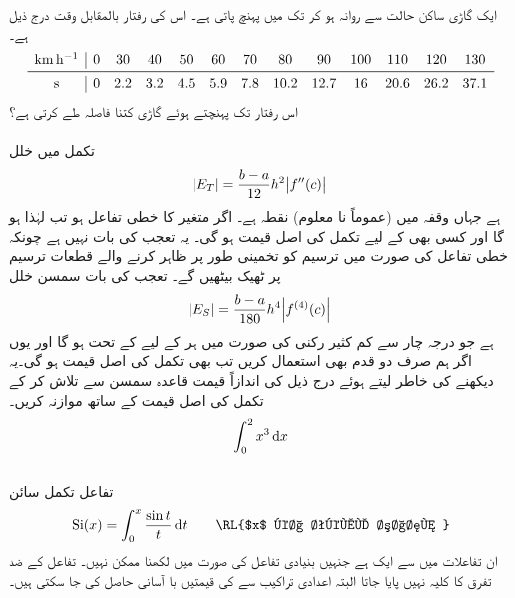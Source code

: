 ایک گاڑی ساکن حالت سے روانہ ہو کر  تک  میں پہنچ پاتی ہے۔ اس کی رفتار بالمقابل وقت درج ذیل ہے۔
\begin{align*}
\begin{array}{c|cccc cccc cccc}
\si{\kilo\meter\per\hour}&0&30&40&50&60&70&80&90&100&110&120&130\\
\midrule
\si{\second}&0&2.2&3.2&4.5&5.9&7.8&10.2&12.7&16&20.6&26.2&37.1
\end{array}
\end{align*}
اس رفتار تک پہنچتے ہوئے گاڑی کتنا فاصلہ طے کرتی ہے؟
\\
\\
تکمل  میں خلل
\begin{align*}
\abs{E_T}=\frac{b-a}{12}h^2\abs{f''(c)}
\end{align*}
ہے جہاں  وقفہ  میں  (عموماً نا معلوم) نقطہ ہے۔ اگر  متغیر  کا خطی تفاعل ہو تب   لہٰذا  ہو گا اور کسی بھی  کے لیے تکمل کی اصل قیمت  ہو گی۔ یہ تعجب کی بات نہیں ہے چونکہ خطی تفاعل کی صورت میں ترسیم کو تخمینی طور پر ظاہر کرنے والے قطعات ترسیم پر ٹھیک بیٹھیں گے۔  تعجب کی بات سمسن خلل
\begin{align*}
\abs{E_S}=\frac{b-a}{180}h^4\abs{f^{(4)}(c)}
\end{align*} 
ہے جو درجہ چار سے کم کثیر رکنی    کی صورت میں ہر  کے لیے   کے تحت   ہو گا اور یوں اگر ہم صرف دو قدم بھی استعمال کریں تب بھی  تکمل کی اصل قیمت ہو گی۔یہ دیکھنے کی خاطر  لیتے ہوئے درج ذیل کی اندازاً قیمت قاعدہ سمسن سے  تلاش کر کے تکمل کی اصل قیمت کے ساتھ موازنہ کریں۔
\begin{align*}
\int_0^2x^3\dif x
\end{align*}
\\
تفاعل  تکمل سائن 
\begin{align*}
\kSi(x)=\int_0^x\frac{\sin t}{t}\dif t\quad\quad\text{\RL{$x$ کا  تکمل سائن }}
\end{align*}
ان تفاعلات  میں سے ایک ہے جنہیں بنیادی تفاعل کی صورت میں لکھنا ممکن نہیں۔ تفاعل  کے ضد تفرق کا کلیہ نہیں پایا جاتا  البتہ اعدادی تراکیب سے  کی قیمتیں با آسانی حاصل کی جا سکتی ہیں۔ 

